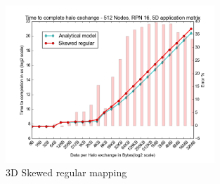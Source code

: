 \documentclass{beamer}
\begin{document}
\begin{frame}
\begin{figure}
\caption{3D Skewed regular mapping}
  \includegraphics[width=0.7\textwidth]{../mappings/3d_skewed_regular.png}
\end{figure}
\end{frame}



\end{document}
